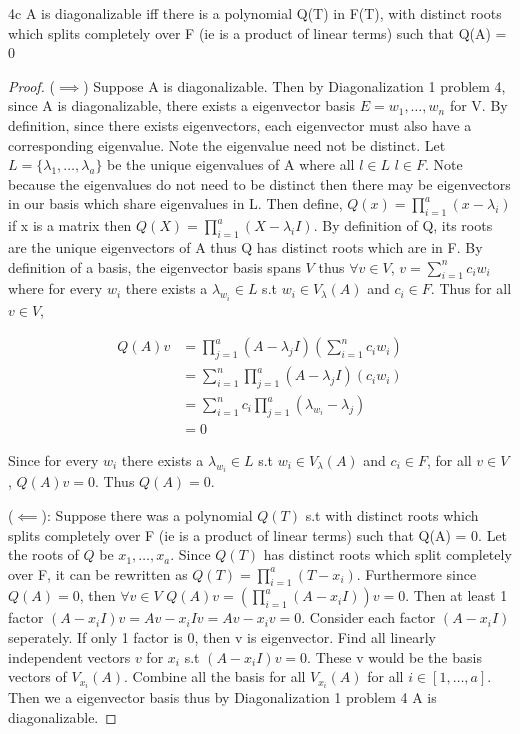 \documentclass{article}
\begin{document}
\begin{claim}{4c}
    A is diagonalizable iff there is a polynomial Q(T) in F(T), with distinct roots which splits completely over F (ie is a product of linear terms) such that Q(A) = 0
\end{claim}
\begin{proof}
    ($\implies$) Suppose A is diagonalizable. Then by Diagonalization 1 problem 4, since A is diagonalizable, there exists a eigenvector basis $E = {w_1, \ldots, w_n}$ for V. By definition, since there exists eigenvectors, each eigenvector must also have a corresponding eigenvalue. Note the eigenvalue need not be distinct. Let $L = \{\lambda_1, \ldots, \lambda_a\}$ be the unique eigenvalues of A where all $l \in L$ $l \in F$. Note because the eigenvalues do not need to be distinct then there may be eigenvectors in our basis which share eigenvalues in L. Then define, $Q(x) = \prod_{i=1}^{a}(x - \lambda_i)$ if x is a matrix then $Q(X)=\prod_{i=1}^{a}(X - \lambda_iI)$. By definition of Q, its roots are the unique eigenvectors of A thus Q has distinct roots which are in F. By definition of a basis, the eigenvector basis spans $V$ thus $\forall v \in V$, $v = \sum_{i=1}^{n}c_iw_i$ where for every $w_i$ there exists a $\lambda_{w_i} \in L$ s.t $w_i \in V_\lambda(A)$ and $c_i \in F$. Thus for all $v \in V$,

    \begin{align*}{}
        Q(A)v &= \prod_{j=1}^{a}(A - \lambda_jI)(\sum_{i=1}^{n}c_iw_i) \\
        &= \sum_{i=1}^{n}\prod_{j=1}^{a}(A - \lambda_jI)(c_iw_i) \\
        &= \sum_{i=1}^{n}c_i\prod_{j=1}^{a}(\lambda_{w_i} - \lambda_j) \\
        &= 0
    \end{align*}

    Since for every $w_i$ there exists a $\lambda_{w_i} \in L$ s.t $w_i \in V_\lambda(A)$ and $c_i \in F$, for all $v \in V$, $Q(A)v = 0$. Thus $Q(A) = 0$.

    ($\impliedby$): Suppose there was a polynomial $Q(T)$ s.t with distinct roots which splits completely over F (ie is a product of linear terms) such that Q(A) = 0. Let the roots of $Q$ be $x_1, \ldots, x_a$. Since $Q(T)$ has distinct roots which split completely over F, it can be rewritten as $Q(T) = \prod_{i=1}^{a}(T - x_i)$. Furthermore since $Q(A) = 0$, then $\forall v \in V$ $Q(A)v =(\prod_{i=1}^{a}(A - x_iI))v= 0$. Then at least 1 factor $(A - x_iI)v = Av - x_iIv = Av - x_iv = 0$. Consider each factor $(A - x_iI)$ seperately. If only 1 factor is 0, then v is eigenvector. Find all linearly independent vectors $v$ for $x_i$ s.t $(A - x_iI)v = 0$. These v would be the basis vectors of $V_{x_i}(A)$. Combine all the basis for all $V_{x_i}(A)$ for all $i \in [1, \ldots, a]$. Then we a eigenvector basis thus by Diagonalization 1 problem 4 A is diagonalizable.
\end{proof}
\end{document}
